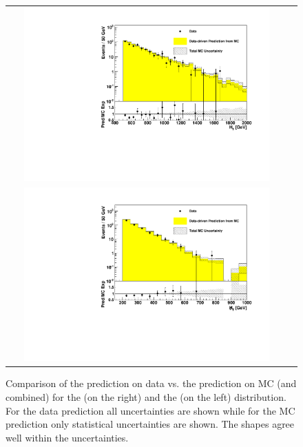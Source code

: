 \begin{figure}[tbhn]
\begin{center}
\begin{tabular}{cc}
\includegraphics[width=0.90\textwidth]{lostlepton/plots/closure/DataVsMCPredictionHT.pdf}\\
\includegraphics[width=0.90\textwidth]{lostlepton/plots/closure/DataVsMCPredictionMHT.pdf}

\end{tabular}
\end{center}
\caption{Comparison of the prediction on data vs. the prediction on MC (\ttbar and \wpj combined) for the \HT (on the right) and the \MHT (on the left) distribution. For the data prediction all uncertainties are shown while for the MC prediction only statistical uncertainties are shown. The shapes agree well within the uncertainties.}
\label{fig:predicDataMC}
\end{figure}


